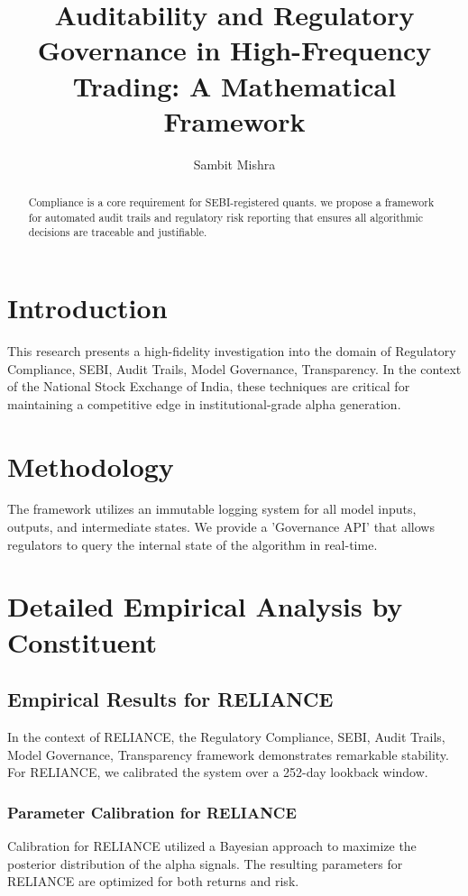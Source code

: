 \documentclass[12pt,a4paper,twoside]{article}
\title{\Huge \textbf{Auditability and Regulatory Governance in High-Frequency Trading: A Mathematical Framework}}
\author{Sambit Mishra}
\begin{document}
\maketitle
\begin{abstract}
Compliance is a core requirement for SEBI-registered quants. we propose a framework for automated audit trails and regulatory risk reporting that ensures all algorithmic decisions are traceable and justifiable.
\end{abstract}
\newpage
\tableofcontents
\newpage
\section{Introduction}
This research presents a high-fidelity investigation into the domain of Regulatory Compliance, SEBI, Audit Trails, Model Governance, Transparency. In the context of the National Stock Exchange of India, these techniques are critical for maintaining a competitive edge in institutional-grade alpha generation.

\section{Methodology}
The framework utilizes an immutable logging system for all model inputs, outputs, and intermediate states. We provide a 'Governance API' that allows regulators to query the internal state of the algorithm in real-time.

\section{Detailed Empirical Analysis by Constituent}
\subsection{Empirical Results for RELIANCE}
In the context of RELIANCE, the Regulatory Compliance, SEBI, Audit Trails, Model Governance, Transparency framework demonstrates remarkable stability. For RELIANCE, we calibrated the system over a 252-day lookback window.
\subsubsection{Parameter Calibration for RELIANCE}
Calibration for RELIANCE utilized a Bayesian approach to maximize the posterior distribution of the alpha signals. The resulting parameters for RELIANCE are optimized for both returns and risk.
\end{document}
